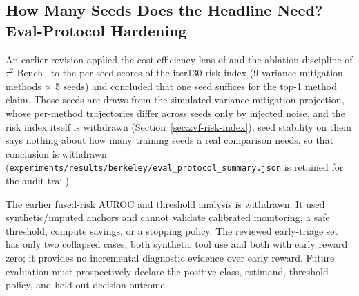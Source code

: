 \subsection{How Many Seeds Does the Headline Need? Eval-Protocol Hardening}
\label{sec:zvf-eval-protocol}

An earlier revision applied the cost-efficiency lens of
\citet{yehudai2025survey} and the ablation discipline of
$\tau^2$-Bench~\citep{barres2025tau2} to the per-seed scores of the iter130 risk
index (9 variance-mitigation methods $\times$ 5 seeds) and concluded that one
seed suffices for the top-1 method claim. Those seeds are draws from the
simulated variance-mitigation projection, whose per-method trajectories differ
across seeds only by injected noise, and the risk index itself is withdrawn
(Section~\ref{sec:zvf-risk-index}); seed stability on them says nothing about
how many training seeds a real comparison needs, so that conclusion is withdrawn
(\texttt{experiments/results/berkeley/eval\_protocol\_summary.json} is retained
for the audit trail).

The earlier fused-risk AUROC and threshold analysis is withdrawn. It used
synthetic/imputed anchors and cannot validate calibrated monitoring, a safe
threshold, compute savings, or a stopping policy. The reviewed early-triage
set has only two collapsed cases, both synthetic tool use and both with early
reward zero; it provides no incremental diagnostic evidence over early reward.
Future evaluation must prospectively declare the positive class, estimand,
threshold policy, and held-out decision outcome.

